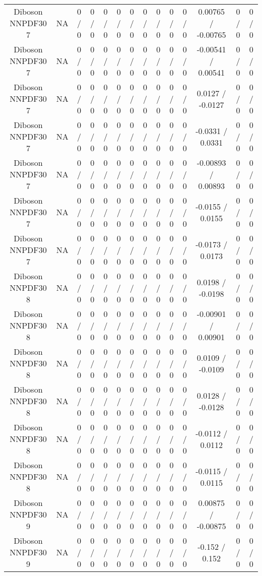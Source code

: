 \documentclass[10pt]{article}
\begin{document}
\begin{table}[htbp]
\begin{center}
\begin{tabular}{|c|c|c|c|c|c|c|c|c|c|c|c|c|c|}
  Diboson NNPDF30 7 &    NA    & 0 / 0 & 0 / 0 & 0 / 0 & 0 / 0 & 0 / 0 & 0 / 0 & 0 / 0 & 0 / 0 & 0 / 0 & 0.00765 / -0.00765 & 0 / 0 & 0 / 0 \\ 
  Diboson NNPDF30 7 &    NA    & 0 / 0 & 0 / 0 & 0 / 0 & 0 / 0 & 0 / 0 & 0 / 0 & 0 / 0 & 0 / 0 & 0 / 0 & -0.00541 / 0.00541 & 0 / 0 & 0 / 0 \\ 
  Diboson NNPDF30 7 &    NA    & 0 / 0 & 0 / 0 & 0 / 0 & 0 / 0 & 0 / 0 & 0 / 0 & 0 / 0 & 0 / 0 & 0 / 0 & 0.0127 / -0.0127 & 0 / 0 & 0 / 0 \\ 
  Diboson NNPDF30 7 &    NA    & 0 / 0 & 0 / 0 & 0 / 0 & 0 / 0 & 0 / 0 & 0 / 0 & 0 / 0 & 0 / 0 & 0 / 0 & -0.0331 / 0.0331 & 0 / 0 & 0 / 0 \\ 
  Diboson NNPDF30 7 &    NA    & 0 / 0 & 0 / 0 & 0 / 0 & 0 / 0 & 0 / 0 & 0 / 0 & 0 / 0 & 0 / 0 & 0 / 0 & -0.00893 / 0.00893 & 0 / 0 & 0 / 0 \\ 
  Diboson NNPDF30 7 &    NA    & 0 / 0 & 0 / 0 & 0 / 0 & 0 / 0 & 0 / 0 & 0 / 0 & 0 / 0 & 0 / 0 & 0 / 0 & -0.0155 / 0.0155 & 0 / 0 & 0 / 0 \\ 
  Diboson NNPDF30 7 &    NA    & 0 / 0 & 0 / 0 & 0 / 0 & 0 / 0 & 0 / 0 & 0 / 0 & 0 / 0 & 0 / 0 & 0 / 0 & -0.0173 / 0.0173 & 0 / 0 & 0 / 0 \\ 
  Diboson NNPDF30 8 &    NA    & 0 / 0 & 0 / 0 & 0 / 0 & 0 / 0 & 0 / 0 & 0 / 0 & 0 / 0 & 0 / 0 & 0 / 0 & 0.0198 / -0.0198 & 0 / 0 & 0 / 0 \\ 
  Diboson NNPDF30 8 &    NA    & 0 / 0 & 0 / 0 & 0 / 0 & 0 / 0 & 0 / 0 & 0 / 0 & 0 / 0 & 0 / 0 & 0 / 0 & -0.00901 / 0.00901 & 0 / 0 & 0 / 0 \\ 
  Diboson NNPDF30 8 &    NA    & 0 / 0 & 0 / 0 & 0 / 0 & 0 / 0 & 0 / 0 & 0 / 0 & 0 / 0 & 0 / 0 & 0 / 0 & 0.0109 / -0.0109 & 0 / 0 & 0 / 0 \\ 
  Diboson NNPDF30 8 &    NA    & 0 / 0 & 0 / 0 & 0 / 0 & 0 / 0 & 0 / 0 & 0 / 0 & 0 / 0 & 0 / 0 & 0 / 0 & 0.0128 / -0.0128 & 0 / 0 & 0 / 0 \\ 
  Diboson NNPDF30 8 &    NA    & 0 / 0 & 0 / 0 & 0 / 0 & 0 / 0 & 0 / 0 & 0 / 0 & 0 / 0 & 0 / 0 & 0 / 0 & -0.0112 / 0.0112 & 0 / 0 & 0 / 0 \\ 
  Diboson NNPDF30 8 &    NA    & 0 / 0 & 0 / 0 & 0 / 0 & 0 / 0 & 0 / 0 & 0 / 0 & 0 / 0 & 0 / 0 & 0 / 0 & -0.0115 / 0.0115 & 0 / 0 & 0 / 0 \\ 
  Diboson NNPDF30 9 &    NA    & 0 / 0 & 0 / 0 & 0 / 0 & 0 / 0 & 0 / 0 & 0 / 0 & 0 / 0 & 0 / 0 & 0 / 0 & 0.00875 / -0.00875 & 0 / 0 & 0 / 0 \\ 
  Diboson NNPDF30 9 &    NA    & 0 / 0 & 0 / 0 & 0 / 0 & 0 / 0 & 0 / 0 & 0 / 0 & 0 / 0 & 0 / 0 & 0 / 0 & -0.152 / 0.152 & 0 / 0 & 0 / 0 \\ 

\end{tabular}
\end{center}
\end{table}
\end{document}
